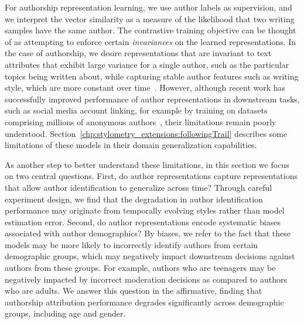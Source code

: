 For authorship representation learning, we use author labels as supervision, and we interpret the vector similarity as a measure of the likelihood that two writing samples have the same author. 
The contrastive training objective can be thought of as attempting to enforce certain \emph{invariances} on the learned representations.
In the case of authorship, we desire representations that are invariant to text attributes that exhibit large variance for a single author, such as the particular topics being written about, while capturing stable author features such as writing style, which are more constant over time~\cite{andrews2019learning}.
However, although recent work has successfully improved performance of author representations in downstream tasks, such as social media account linking, for example by training on datasets comprising millions of anonymous authors~\cite{khan2021deep}, their limitations remain poorly understood. 
Section~\ref{chp:stylometry_extensions:followingTrail} describes some limitations of these models in their domain generalization capabilities.

As another step to better understand these limitations, in this section we focus on two central questions. 
First, do author representations capture representations that allow author identification to generalize across time?
Through careful experiment design, we find that the degradation in author identification performance may originate from temporally evolving styles rather than model estimation error.
Second, do author representations encode systematic biases associated with author demographics? 
By biases, we refer to the fact that these models may be more likely to incorrectly identify authors from certain demographic groups, which may negatively impact downstream decisions against authors from these groups.
For example, authors who are teenagers may be negatively impacted by incorrect moderation decisions as compared to authors who are adults. 
We answer this question in the affirmative, finding that authorship attribution performance degrades significantly across demographic groups, including age and gender. 

